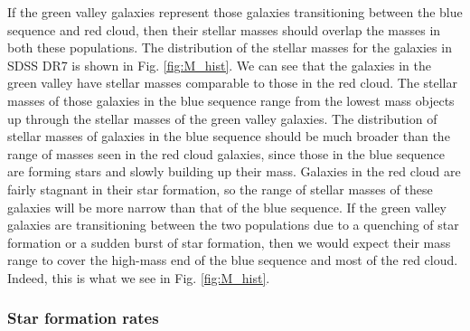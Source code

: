 If the green valley galaxies represent those galaxies transitioning between the 
blue sequence and red cloud, then their stellar masses should overlap the masses 
in both these populations.  The distribution of the stellar masses for the 
galaxies in SDSS DR7 is shown in Fig. \ref{fig:M_hist}.  We can see that the 
galaxies in the green valley have stellar masses comparable to those in the red 
cloud.  The stellar masses of those galaxies in the blue sequence range from the 
lowest mass objects up through the stellar masses of the green valley galaxies.  
The distribution of stellar masses of galaxies in the blue sequence should be 
much broader than the range of masses seen in the red cloud galaxies, since 
those in the blue sequence are forming stars and slowly building up their mass.  
Galaxies in the red cloud are fairly stagnant in their star formation, so the 
range of stellar masses of these galaxies will be more narrow than that of the 
blue sequence.  If the green valley galaxies are transitioning between the two 
populations due to a quenching of star formation or a sudden burst of star 
formation, then we would expect their mass range to cover the high-mass end of 
the blue sequence and most of the red cloud.  Indeed, this is what we see in 
Fig. \ref{fig:M_hist}.


\subsubsection{Star formation rates}

